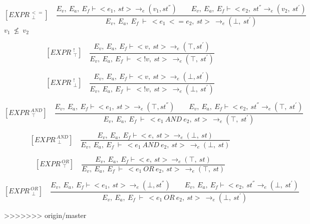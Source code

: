   	\[
   	[EXPR^{\ <=}_{\ \ \bot}] \quad
   	\dfrac{E_v, \ E_a, \ E_f \vdash <e_1, \ st> \rightarrow_e (v_1, st^{''}) \qquad E_v, \ E_a, \ E_f \vdash <e_2, \ st^{''} \rightarrow_e (v_2, \ st^{'})}{E_v, \ E_a, \ E_f \ \vdash \ <e_1 \ <= e_2, \ st> \ \rightarrow_e (\bot, \ st^{'})}
   	\]
	\begin{math}
   	v_1 \ \nleq \ v_2
   	\end{math}
   	
   	\[
   	[EXPR^{\ \ !}_{\ \ \top}] \quad
   	\dfrac{E_v, \ E_a, \ E_f \vdash <v, \ st> \rightarrow_e (\top, st^{'})}{E_v, \ E_a, \ E_f \ \vdash \ <!v, \ st> \ \rightarrow_e (\top, \ st^{'})}
   	\]  	  	

   	\[
   	[EXPR^{\ \ !}_{\ \ \bot}] \quad
   	\dfrac{E_v, \ E_a, \ E_f \vdash <v, \ st> \rightarrow_e (\bot, st^{'})}{E_v, \ E_a, \ E_f \ \vdash \ <!v, \ st> \ \rightarrow_e (\bot, \ st^{'})}
   	\]
   	
   	
   	\[
   	[EXPR^{\ AND}_{\ \ \top}] \quad
   	\dfrac{E_v, \ E_a, \ E_f \vdash <e_1, \ st> \rightarrow_e (\top, st^{''}) \qquad E_v, \ E_a, \ E_f \vdash <e_2, \ st^{''} \rightarrow_e (\top, \ st^{'})}{E_v, \ E_a, \ E_f \ \vdash \ <e_1 \ AND \ e_2, \ st> \ \rightarrow_e (\top, \ st^{'})}
   	\]  	
   	
   	\[
   	[EXPR^{\ AND}_{\ \ \bot}] \quad
   	\dfrac{E_v, \ E_a, \ E_f \vdash <e, \ st> \rightarrow_e (\bot, \ st) }{E_v, \ E_a, \ E_f \ \vdash \ <e_1 \ AND \ e_2, \ st> \ \rightarrow_e (\bot, \ st)}
   	\]
   	
   	
   	\[
   	[EXPR^{\ OR}_{\ \ \top}] \quad
   	\dfrac{E_v, \ E_a, \ E_f \vdash <e, \ st> \rightarrow_e (\top, \ st) }{E_v, \ E_a, \ E_f \ \vdash \ <e_1 \ OR \ e_2, \ st> \ \rightarrow_e (\top, \ st)}
   	\]
   	
   	\[
   	[EXPR^{\ OR}_{\ \ \bot}] \quad
   	\dfrac{E_v, \ E_a, \ E_f \vdash <e_1, \ st> \rightarrow_e (\bot, st^{''}) \qquad E_v, \ E_a, \ E_f \vdash <e_2, \ st^{''} \rightarrow_e (\bot, \ st^{'})}{E_v, \ E_a, \ E_f \ \vdash \ <e_1 \ OR \ e_2, \ st> \ \rightarrow_e (\bot, \ st^{'})}
   	\]  	
   	
   	
>>>>>>> origin/master
